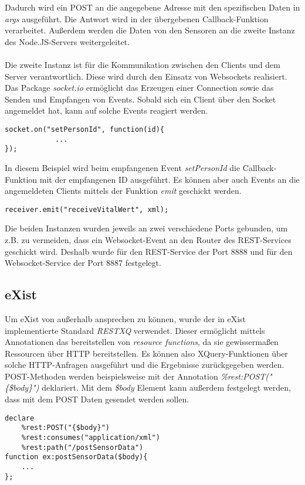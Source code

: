 Dadurch wird ein POST an die angegebene Adresse mit den spezifischen Daten in \textit{args} ausgeführt. Die Antwort wird in der übergebenen Callback-Funktion verarbeitet. Außerdem  werden die Daten von den Sensoren an die zweite Instanz des Node.JS-Servers weitergeleitet.
\\
\\
Die zweite Instanz ist für die Kommunikation zwischen den Clients und dem Server verantwortlich. Diese wird durch den Einsatz von Websockets realisiert. Das Package \textit{socket.io} ermöglicht das Erzeugen einer Connection sowie das Senden und Empfangen von Events. Sobald sich ein Client über den Socket angemeldet hat, kann auf solche Events reagiert werden.

\begin{lstlisting}
socket.on("setPersonId", function(id){
            ...
});
\end{lstlisting}

In diesem Beispiel wird beim empfangenen Event \textit{setPersonId} die Callback-Funktion mit der empfangenen ID ausgeführt. Es können aber auch Events an die angemeldeten Clients mittels der Funktion \textit{emit} geschickt werden.

\begin{lstlisting}
receiver.emit("receiveVitalWert", xml);
\end{lstlisting}

Die beiden Instanzen wurden jeweils an zwei verschiedene Ports gebunden, um z.B. zu vermeiden, dass ein Websocket-Event an den Router des REST-Services geschickt wird. Deshalb wurde für den REST-Service der Port 8888 und für den Websocket-Service der Port 8887 festgelegt.

\subsection{eXist}
Um eXist von außerhalb ansprechen zu können, wurde der in eXist implementierte Standard \textit{RESTXQ} verwendet. Dieser ermöglicht mittels Annotationen das bereitstellen von \textit{resource functions}, da sie gewissermaßen Ressourcen über HTTP bereitstellen. Es können also XQuery-Funktionen über solche HTTP-Anfragen ausgeführt und die Ergebnisse zurückgegeben werden. POST-Methoden werden beispielsweise mit der Annotation \textit{\%rest:POST("\{\$body\}")} deklariert. Mit dem \textit{\$body} Element kann außerdem festgelegt werden, dass mit dem POST Daten gesendet werden sollen.

\begin{lstlisting}
declare
    %rest:POST("{$body}")
    %rest:consumes("application/xml")
    %rest:path("/postSensorData")
function ex:postSensorData($body){
    ...
};
\end{lstlisting}

